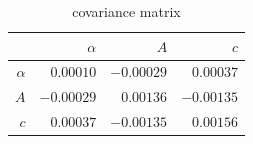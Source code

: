 \begin{table}
    \centering
    \caption{covariance matrix}

 \begin{tabular}{|r|r|r|r|}
 \hline 
\cellcolor{tabcolor}&\cellcolor{tabcolor}$\alpha$&\cellcolor{tabcolor}$A$&\cellcolor{tabcolor}$c$\\ \hline 
 \cellcolor{tabcolor}$\alpha$&$0.00010$ &$-0.00029$ &$0.00037$ \\ \hline
\cellcolor{tabcolor}$A$&$-0.00029$ &$0.00136$ &$-0.00135$ \\ \hline
\cellcolor{tabcolor}$c$&$0.00037$ &$-0.00135$ &$0.00156$ \\ \hline
\end{tabular}
\end{table}
